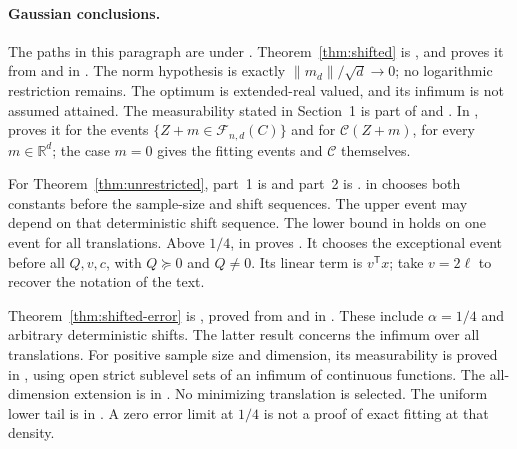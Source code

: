 \documentclass[11pt]{article}
\newcommand{\R}{\mathbb R}
\newcommand{\norm}[1]{\lVert#1\rVert}
\newcommand{\Fit}{\mathcal F}
\newcommand{\Copt}{\mathcal C}
\theoremstyle{remark}
\begin{document}
\paragraph{Gaussian conclusions.}
The paths in this paragraph are under .
Theorem~\ref{thm:shifted} is , and
 proves it from
 and
 in .
The norm hypothesis is exactly $\norm{m_d}/\sqrt d\to0$; no logarithmic
restriction remains. The optimum is extended-real valued, and its
infimum is not assumed attained. The measurability stated in Section~1
is part of  and
. In ,
 proves it for the events
$\{Z+m\in\Fit_{n,d}(C)\}$ and
 for $\Copt(Z+m)$, for
every $m\in\R^d$; the case $m=0$ gives the fitting events and $\Copt$
themselves.

For Theorem~\ref{thm:unrestricted}, part~1 is
 and part~2 is
.
 in
 chooses both constants before the sample-size
and shift sequences. The upper event may depend on that deterministic
shift sequence. The lower bound in  holds on one
event for all translations. Above $1/4$,
 in 
proves . It chooses the exceptional
event before all $Q,v,c$, with $Q\succeq0$ and $Q\ne0$. Its linear term
is $v^{\mathsf T}x$; take $v=2\ell$ to recover the notation of the text.

Theorem~\ref{thm:shifted-error} is ,
proved from  and
 in .
These include $\alpha=1/4$ and arbitrary deterministic shifts.
The latter result concerns the infimum over all translations.
For positive sample size and dimension, its measurability is proved in
, using open strict sublevel sets of an
infimum of continuous functions. The all-dimension extension is
 in
. No minimizing translation is selected. The uniform lower tail is
 in
. A zero error limit at $1/4$ is not a proof
of exact fitting at that density.
\end{document}
